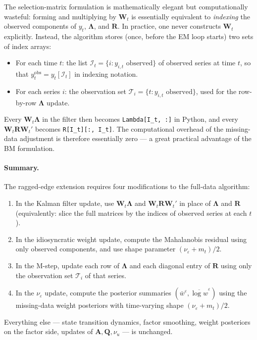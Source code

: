 \documentclass[11pt, a4paper, oneside]{article}
\newcommand{\mL}{\boldsymbol{\Lambda}}
\begin{document}
The selection-matrix formulation is mathematically elegant but
computationally wasteful: forming and multiplying by $\mathbf{W}_t$ is
essentially equivalent to \emph{indexing} the observed components of
$y_t$, $\mL$, and $\mathbf{R}$. In practice, one never
constructs $\mathbf{W}_t$ explicitly. Instead, the algorithm stores
(once, before the EM loop starts) two sets of index arrays:
\begin{itemize}[leftmargin=1.5em, itemsep=2pt]
    \item For each time $t$: the list $\mathcal{I}_t = \{i : y_{i,t} \text{ observed}\}$
          of observed series at time $t$, so that $y_t^{\mathrm{obs}} = y_t[\mathcal{I}_t]$
          in indexing notation.
    \item For each series $i$: the observation set
          $\mathcal{T}_i = \{t : y_{i,t} \text{ observed}\}$, used for
          the row-by-row $\mL$ update.
\end{itemize}
Every $\mathbf{W}_t \mL$ in the filter then becomes
\texttt{Lambda[I\_t, :]} in Python, and every $\mathbf{W}_t \mathbf{R} \mathbf{W}_t'$
becomes \texttt{R[I\_t][:, I\_t]}. The computational overhead of the
missing-data adjustment is therefore essentially zero — a great
practical advantage of the BM formulation.

\paragraph{Summary.}
The ragged-edge extension requires four modifications to the full-data
algorithm:
\begin{enumerate}[leftmargin=1.5em, itemsep=2pt]
    \item In the Kalman filter update, use $\mathbf{W}_t \mL$
          and $\mathbf{W}_t \mathbf{R} \mathbf{W}_t'$ in place of $\mL$
          and $\mathbf{R}$ (equivalently: slice the full matrices by
          the indices of observed series at each $t$).
    \item In the idiosyncratic weight update, compute the Mahalanobis
          residual using only observed components, and use shape
          parameter $(\nu_\varepsilon + m_t)/2$.
    \item In the M-step, update each row of $\mL$ and each
          diagonal entry of $\mathbf{R}$ using only the observation set
          $\mathcal{T}_i$ of that series.
    \item In the $\nu_\varepsilon$ update, compute the posterior
          summaries $(\bar{w}^\varepsilon, \overline{\log w}^\varepsilon)$
          using the missing-data weight posteriors with time-varying
          shape $(\nu_\varepsilon + m_t)/2$.
\end{enumerate}
Everything else — state transition dynamics, factor smoothing, weight
posteriors on the factor side, updates of $\mathbf{A}, \mathbf{Q}, \nu_u$ —
is unchanged.
\end{document}
